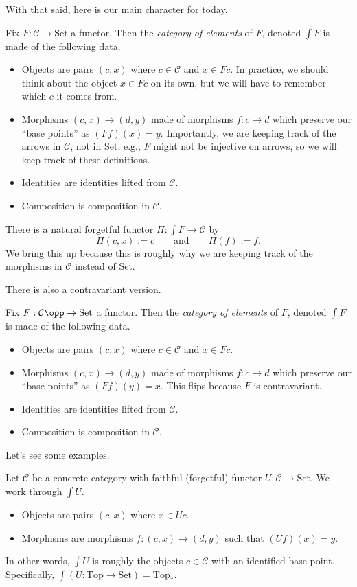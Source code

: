 With that said, here is our main character for today.
\begin{definition}
	Fix $F:\mathcal C\to\mathrm{Set}$ a functor. Then the \textit{category of elements} of $F$, denoted $\int F$ is made of the following data.
	\begin{itemize}
		\item Objects are pairs $(c,x)$ where $c\in\mathcal C$ and $x\in Fc$. In practice, we should think about the object $x\in Fc$ on its own, but we will have to remember which $c$ it comes from.
		\item Morphisms $(c,x)\to(d,y)$ made of morphisms $f:c\to d$ which preserve our ``base points'' as $(Ff)(x)=y$. Importantly, we are keeping track of the arrows in $\mathcal C$, not in $\mathrm{Set}$; e.g., $F$ might not be injective on arrows, so we will keep track of these definitions.
		\item Identities are identities lifted from $\mathcal C$.
		\item Composition is composition in $\mathcal C$.
	\end{itemize}
\end{definition}
\begin{remark}
	There is a natural forgetful functor $\Pi:\int F\to\mathcal C$ by
	\[\Pi(c,x):=c\qquad\text{and}\qquad\Pi(f):=f.\]
	We bring this up because this is roughly why we are keeping track of the morphisms in $\mathcal C$ instead of $\mathrm{Set}$.
\end{remark}
There is also a contravariant version.
\begin{definition}
	Fix $F:\mathcal C\opp\to\mathrm{Set}$ a functor. Then the \textit{category of elements} of $F$, denoted $\int F$ is made of the following data.
	\begin{itemize}
		\item Objects are pairs $(c,x)$ where $c\in\mathcal C$ and $x\in Fc$.
		\item Morphisms $(c,x)\to(d,y)$ made of morphisms $f:c\to d$ which preserve our ``base points'' as $(Ff)(y)=x$. This flips because $F$ is contravariant.
		\item Identities are identities lifted from $\mathcal C$.
		\item Composition is composition in $\mathcal C$.
	\end{itemize}
\end{definition}
Let's see some examples.
\begin{example}
	Let $\mathcal C$ be a concrete category with faithful (forgetful) functor $U:\mathcal C\to\mathrm{Set}$. We work through $\int U$.
	\begin{itemize}
		\item Objects are pairs $(c,x)$ where $x\in Uc$.
		\item Morphisms are morphisms $f:(c,x)\to(d,y)$ such that $(Uf)(x)=y$.
	\end{itemize}
	In other words, $\int U$ is roughly the objects $c\in\mathcal C$ with an identified base point. Specifically, $\int (U:\mathrm{Top}\to\mathrm{Set})=\mathrm{Top}_*$.
\end{example}

